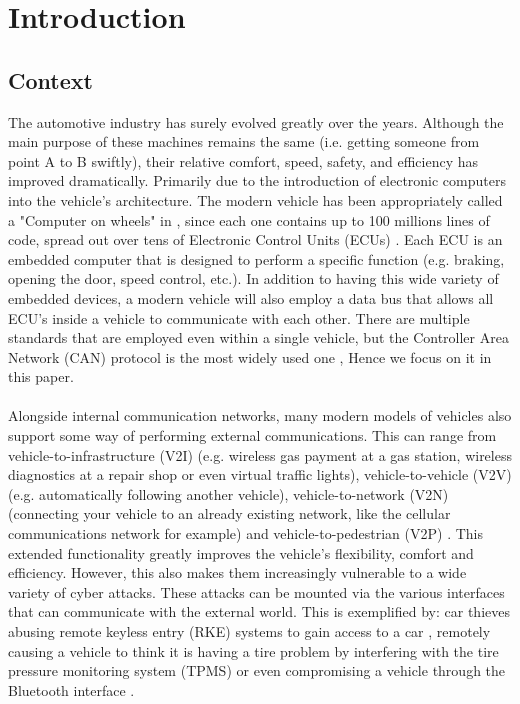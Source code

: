 \chapter{Introduction}
\label{sec:introduction}

\section{Context}
\label{sec:context}

The automotive industry has surely evolved greatly over the years. Although the main purpose of these machines remains the same (i.e. getting someone from point A to B swiftly), their relative comfort, speed, safety, and efficiency has improved dramatically. Primarily due to the introduction of electronic computers into the vehicle's architecture. The modern vehicle has been appropriately called a "Computer on wheels" in \cite{Klinedinst05}, since each one contains up to 100 millions lines of code, spread out over tens of Electronic Control Units (ECUs) \cite{Pike15}. Each ECU is an embedded computer that is designed to perform a specific function (e.g. braking, opening the door, speed control, etc.). In addition to having this wide variety of embedded devices, a modern vehicle will also employ a data bus that allows all ECU's inside a vehicle to communicate with each other. There are multiple standards that are employed even within a single vehicle, but the Controller Area Network (CAN) protocol is the most widely used one \cite{VatiCAN}, Hence we focus on it in this paper. \\ \\ Alongside internal communication networks, many modern models of vehicles also support some way of performing external communications. This can range from vehicle-to-infrastructure (V2I) (e.g. wireless gas payment at a gas station, wireless diagnostics at a repair shop or even virtual traffic lights), vehicle-to-vehicle (V2V) (e.g. automatically following another vehicle), vehicle-to-network (V2N) (connecting your vehicle to an already existing network, like the cellular communications network for example) and vehicle-to-pedestrian (V2P) \cite{Kleberger15,Russel17,Ahmed}. This extended functionality greatly improves the vehicle's flexibility, comfort and efficiency. However, this also makes them increasingly vulnerable to a wide variety of cyber attacks. These attacks can be mounted via the various interfaces that can communicate with the external world. This is exemplified by: car thieves abusing remote keyless entry (RKE) systems to gain access to a car \cite{KeeLoq,MillerA}, remotely causing a vehicle to think it is having a tire problem by interfering with the tire pressure monitoring system (TPMS) \cite{MillerA} or even compromising a vehicle through the Bluetooth interface \cite{Kosher2,Kosher}. \\ \\
